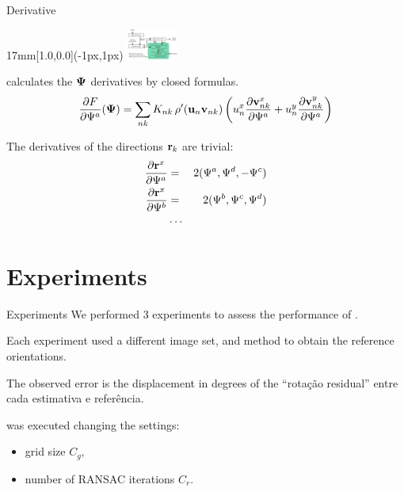 \begin{frame}{Derivative}
  \begin{textblock*}{17mm}[1.0,0.0](\paperwidth-1px,1px)
    \includegraphics[width=17mm]{blocos_s4.png}
  \end{textblock*}
  \corisco calculates the ${\boldsymbol{\Psi}}$ derivatives by closed formulas.
  \[
  \frac{\partial F}{\partial{\Psi^a}}({\boldsymbol{\Psi}}) = \sum_{nk}K_{nk}\,\rho^\prime({\mathbf{u}}_n{\mathbf{v}}_{nk})
  \left(u_n^x\frac{\partial{\mathbf{v}}_{nk}^x}{\partial{\Psi^a}} + u_n^y\frac{\partial{\mathbf{v}}_{nk}^y}{\partial{\Psi^a}}\right)
  \]

  The derivatives of the directions ${\mathbf{r}}_k$ are trivial:
    \begin{eqnarray*}
      \frac{\partial {\mathbf{r}}^x}{\partial {\Psi^a}} &=& 2( {\Psi^a}, {\Psi^d},-{\Psi^c})\\
      \frac{\partial {\mathbf{r}}^x}{\partial {\Psi^b}} &=& 2( {\Psi^b}, {\Psi^c}, {\Psi^d})\\
      &\cdots&
    \end{eqnarray*}
  
\end{frame}

















\section[5--Experiments]{Experiments}

\begin{frame}{Experiments}
  We performed 3 experiments to assess the performance of \corisco.

  Each experiment used a different image set, and method to obtain the reference orientations.

  The observed error is the displacement in degrees of the ``rotação residual'' entre
  cada estimativa e referência.

  \corisco was executed changing the settings:\\
  \begin{itemize}
  \item grid size $C_g$,
  \item number of RANSAC iterations $C_r$.
  \end{itemize}
\end{frame}


